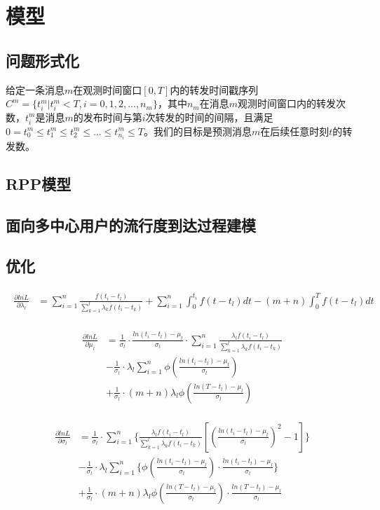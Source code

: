 \section{模型}
\subsection{问题形式化}
给定一条消息$m$在观测时间窗口$[0,T]$内的转发时间戳序列$C^m=\{t_i^m|t_i^m<T,i=0,1,2,...,n_m\}$，其中$n_m$在消息$m$观测时间窗口内的转发次数，$t_i^m$是消息$m$的发布时间与第$i$次转发的时间的间隔，且满足$0=t_0^m \le t_1^m \le t_2^m \le...\le t_{n_i}^m \le T$。我们的目标是预测消息$m$在后续任意时刻$t$的转发数。

\subsection{RPP模型}
\subsection{面向多中心用户的流行度到达过程建模}
\subsection{优化}

\begin{eqnarray}
\label{eq:gradLambda}
\begin{split}
\frac{\partial lnL}{\partial \lambda_l} & = \sum_{i=1}^{n}\frac{f(t_i-t_l)}{\sum_{k=1}^{l} \lambda_k f(t_i-t_k)} + \sum_{i=1}^{n} \int_{0}^{t_i}f(t-t_l)dt - (m+n)\int_{0}^{T}f(t-t_l)dt
\end{split}
\end{eqnarray}

\begin{eqnarray}
\label{eq:gradMu}
\begin{split}
\frac{\partial lnL}{\partial \mu_l} & = \frac{1}{\sigma_l} \cdot \frac{ln(t_i-t_l)-\mu_l}{\sigma_l} \cdot \sum_{i=1}^{n}\frac{\lambda_l f(t_i-t_l)}{\sum_{k=1}^{l} \lambda_k f(t_i-t_k)} \\
& - \frac{1}{\sigma_l} \cdot\lambda_l \sum_{i=1}^{n} \phi(\frac{ln(t_i-t_l)-\mu_l}{\sigma_l}) \\
& + \frac{1}{\sigma_l}\cdot (m+n)\lambda_l \phi(\frac{ln(T-t_l)-\mu_l}{\sigma_l})
\end{split}
\end{eqnarray}

\begin{eqnarray}
\label{eq:gradSigma}
\begin{split}
\frac{\partial lnL}{\partial \sigma_l} & = \frac{1}{\sigma_l} \cdot \sum_{i=1}^{n}\{\frac{\lambda_l f(t_i-t_l)}{\sum_{k=1}^{l} \lambda_k f(t_i-t_k)}[(\frac{ln(t_i-t_l)-\mu_l}{\sigma_l})^2-1]\} \\
& -\frac{1}{\sigma_l} \cdot \lambda_l\sum_{i=1}^{n}\{\phi(\frac{ln(t_i-t_l)-\mu_l}{\sigma_l}) \cdot \frac{ln(t_i-t_l)-\mu_l}{\sigma_l}\} \\
& + \frac{1}{\sigma_l} \cdot (m+n)\lambda_l \phi(\frac{ln(T-t_l)-\mu_l}{\sigma_l}) \cdot \frac{ln(T-t_l)-\mu_l}{\sigma_l}
\end{split}
\end{eqnarray}


